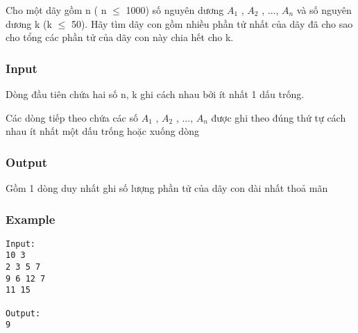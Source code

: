 



   Cho một dãy gồm n ( n  $\le$  1000) số nguyên dương $A_{1}$   , $A_{2}$   , ..., $A_{n}$   và số nguyên dương k (k  $\le$  50). Hãy tìm dãy con gồm nhiều phần tử nhất của dãy đã cho sao cho tổng các phần tử của dãy con này chia hết cho k.  

\subsubsection{   Input  }

   Dòng đầu tiên chứa hai số n, k ghi cách nhau bởi ít nhất 1 dấu trống.  

   Các dòng tiếp theo chứa các số $A_{1}$   , $A_{2}$   , ..., $A_{n}$   được ghi theo đúng thứ tự cách nhau ít nhất một dấu trống hoặc xuống dòng  

\subsubsection{   Output  }

   Gồm 1 dòng duy nhất ghi số lượng phần tử của dãy con dài nhất thoả mãn  

\subsubsection{   Example  }
\begin{verbatim}
Input:
10 3
2 3 5 7
9 6 12 7
11 15

Output:
9
\end{verbatim}
